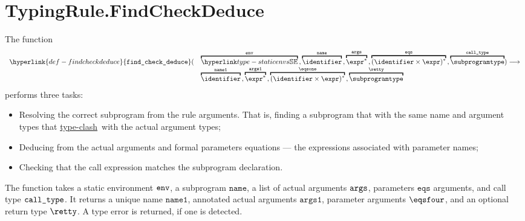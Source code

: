 \documentclass{book}
\newcommand\typeclash[0]{\hyperlink{def-typeclashes}{type-clash}}
\newcommand\findcheckdeduce[0]{\hyperlink{def-findcheckdeduce}{\texttt{find\_check\_deduce}}}
\newcommand\eqs[0]{\texttt{eqs}}
\newcommand\nameone[0]{\texttt{name1}}
\newcommand\vargsone[0]{\texttt{args1}}
\newcommand\name[0]{\texttt{name}}
\begin{document}
\section{TypingRule.FindCheckDeduce \label{sec:TypingRule.FindCheckDeduce}}
\hypertarget{def-findcheckdeduce}{}
The function
\[
  \begin{array}{rl}
    \findcheckdeduce( &
      \overname{\staticenvs}{\tenv} \aslsep
      \overname{\identifier}{\name} \aslsep
      \overname{\expr^*}{\vargs} \aslsep
      \overname{(\identifier\times\expr)^*}{\eqs} \aslsep
      \overname{\subprogramtype}{\calltype}
     ) \aslto \\ &
    \overname{\identifier}{\nameone} \aslsep
    \overname{\expr^*}{\vargsone} \aslsep
    \overname{(\identifier\times\expr)^*}{\eqsone} \aslsep
    \overname{\subprogramtype}{\retty}
  \end{array}
\]
performs three tasks:
\begin{itemize}
  \item Resolving the correct subprogram from the rule arguments. That is, finding a subprogram
  that with the same name and argument types that \typeclash\ with the actual argument types;
  \item Deducing from the actual arguments and formal parameters equations ---
  the expressions associated with parameter names;
  \item Checking that the call expression matches the subprogram declaration.
\end{itemize}
The function takes a static environment $\texttt{env}$, a subprogram $\name$,
a list of actual arguments $\texttt{args}$,
parameters $\eqs$ arguments, and call type $\texttt{call\_type}$.
It returns a unique name $\nameone$, annotated actual arguments $\vargsone$,
parameter arguments $\eqsfour$, and an optional return type $\retty$.
A type error is returned, if one is detected.
\end{document}
